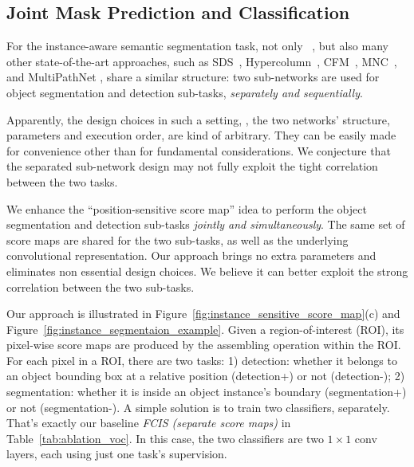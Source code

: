 \documentclass[10pt,twocolumn,letterpaper]{article}
\begin{document}
\subsection{Joint Mask Prediction and Classification}
\label{sec.joint_formulation}
For the instance-aware semantic segmentation task, not only ~\cite{dai2016instance}, but also many other state-of-the-art approaches, such as SDS~\cite{hariharan2014simultaneous}, Hypercolumn~\cite{hariharan2015hyper}, CFM~\cite{dai2015convolutional}, MNC~\cite{dai2016mnc}, and MultiPathNet \cite{zagoruyko2016multipath}, share a similar structure: two sub-networks are used for object segmentation and detection sub-tasks, \emph{separately and sequentially}.

Apparently, the design choices in such a setting, \eg, the two networks' structure, parameters and execution order, are kind of arbitrary. They can be easily made for convenience other than for fundamental considerations. We conjecture that the separated sub-network design may not fully exploit the tight correlation between the two tasks.

We enhance the ``position-sensitive score map'' idea to perform the object segmentation and detection sub-tasks \emph{jointly and simultaneously}. The same set of score maps are shared for the two sub-tasks, as well as the underlying convolutional representation. Our approach brings no extra parameters and eliminates non essential design choices. We believe it can better exploit the strong correlation between the two sub-tasks.

Our approach is illustrated in Figure~\ref{fig:instance_sensitive_score_map}(c) and Figure~\ref{fig:instance_segmentaion_example}. Given a region-of-interest (ROI), its pixel-wise score maps are produced by the assembling operation within the ROI. For each pixel in a ROI, there are two tasks: 1) detection: whether it belongs to an object bounding box at a relative position (detection+) or not (detection-); 2) segmentation: whether it is inside an object instance's boundary (segmentation+) or not (segmentation-). A simple solution is to train two classifiers, separately. That's exactly our baseline \emph{FCIS (separate score maps)} in Table~\ref{tab:ablation_voc}. In this case, the two classifiers are two $1\times 1$ conv layers, each using just one task's supervision.
\end{document}
